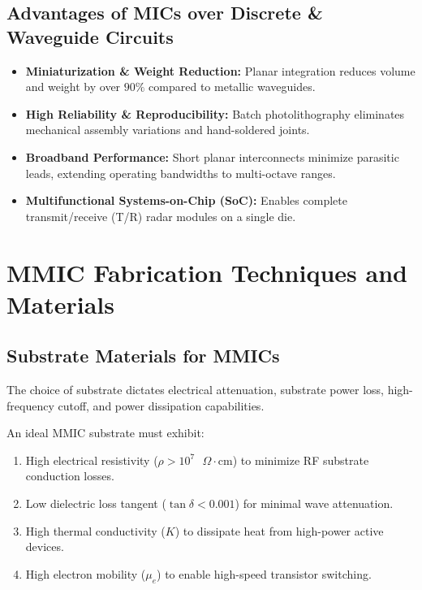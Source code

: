 \documentclass[10pt,a4paper]{article}
\begin{document}
\subsection{Advantages of MICs over Discrete \& Waveguide Circuits}
\begin{itemize}[leftmargin=*, itemsep=4pt]
  \item \textbf{Miniaturization \& Weight Reduction:} Planar integration reduces volume and weight by over $90\%$ compared to metallic waveguides.
  \item \textbf{High Reliability \& Reproducibility:} Batch photolithography eliminates mechanical assembly variations and hand-soldered joints.
  \item \textbf{Broadband Performance:} Short planar interconnects minimize parasitic leads, extending operating bandwidths to multi-octave ranges.
  \item \textbf{Multifunctional Systems-on-Chip (SoC):} Enables complete transmit/receive (T/R) radar modules on a single die.
\end{itemize}

\section{MMIC Fabrication Techniques and Materials}

\subsection{Substrate Materials for MMICs}
The choice of substrate dictates electrical attenuation, substrate power loss, high-frequency cutoff, and power dissipation capabilities.

\begin{tcolorbox}[masonbox, title={Substrate Requirements for MMICs}]
  An ideal MMIC substrate must exhibit:
  \begin{enumerate}[leftmargin=*, noitemsep]
    \item High electrical resistivity ($\rho > 10^7\text{ }\Omega\cdot\text{cm}$) to minimize RF substrate conduction losses.
    \item Low dielectric loss tangent ($\tan\delta < 0.001$) for minimal wave attenuation.
    \item High thermal conductivity ($K$) to dissipate heat from high-power active devices.
    \item High electron mobility ($\mu_e$) to enable high-speed transistor switching.
  \end{enumerate}
\end{tcolorbox}
\end{document}
